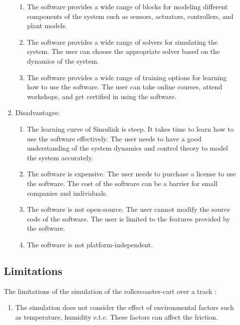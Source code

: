 \documentclass{article}
\begin{document}
\begin{itemize}
\begin{enumerate}
\begin{enumerate}
                \item The software provides a wide range of blocks for modeling different
                    components of the system such as sensors, actuators, controllers,
                    and plant models.

                \item The software provides a wide range of solvers for simulating
                    the system. The user can choose the appropriate solver based
                    on the dynamics of the system.

                \item The software provides a wide range of training options for
                    learning how to use the software. The user can take online
                    courses, attend workshops, and get certified in using the
                    software.
            \end{enumerate}

        \item Disadvantages:
            \begin{enumerate}
                \item The learning curve of Simulink is steep. It takes time to
                    learn how to use the software effectively. The user needs to
                    have a good understanding of the system dynamics and control
                    theory to model the system accurately.

                \item The software is expensive. The user needs to purchase a
                    license to use the software. The cost of the software can be
                    a barrier for small companies and individuals.

                \item The software is not open-source. The user cannot modify
                    the source code of the software. The user is limited to the features
                    provided by the software.

                \item The software is not platform-independent.
            \end{enumerate}
    \end{enumerate}

    \subsection{Limitations}
    The limitations of the simulation of the rollercoaster-cart over a track :
    \begin{enumerate}
        \item The simulation does not consider the effect of environmental factors
            such as temperature, humidity e.t.c. These factors can affect the friction.


\end{enumerate}
\end{itemize}
\end{document}

